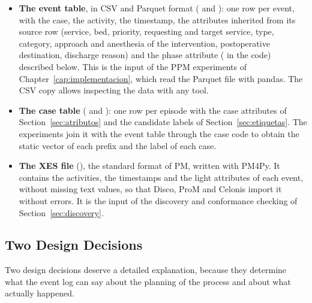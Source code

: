 \begin{itemize}[leftmargin=*]
  \item \textbf{The event table}, in CSV and Parquet format ( and ): one row per event, with the case, the activity, the timestamp, the attributes inherited from its source row (service, bed, priority, requesting and target service, type, category, approach and anesthesia of the intervention, postoperative destination, discharge reason) and the phase attribute ( in the code) described below. This is the input of the PPM experiments of Chapter~\ref{cap:implementacion}, which read the Parquet file with pandas. The CSV copy allows inspecting the data with any tool.
  \item \textbf{The case table} ( and ): one row per episode with the case attributes of Section~\ref{sec:atributos} and the candidate labels of Section~\ref{sec:etiquetas}. The experiments join it with the event table through the case code to obtain the static vector of each prefix and the label of each case.
  \item \textbf{The XES file} (), the standard format of PM, written with PM4Py. It contains the activities, the timestamps and the light attributes of each event, without missing text values, so that Disco, ProM and Celonis import it without errors. It is the input of the discovery and conformance checking of Section~\ref{sec:discovery}.
\end{itemize}

\subsection{Two Design Decisions}

Two design decisions deserve a detailed explanation, because they determine what the event log can say about the planning of the process and about what actually happened.

